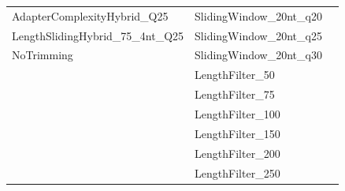 \begin{table}[ht]
{\begin{tabular}{|l|l|l|}
AdapterComplexityHybrid\_Q25               & SlidingWindow\_20nt\_q20                &                                      \\
LengthSlidingHybrid\_75\_4nt\_Q25           & SlidingWindow\_20nt\_q25                &                                      \\
NoTrimming                                  & SlidingWindow\_20nt\_q30                &                                      \\
                                            & LengthFilter\_50                        &                                      \\
                                            & LengthFilter\_75                        &                                      \\
                                            & LengthFilter\_100                       &                                      \\
                                            & LengthFilter\_150                       &                                      \\
                                            & LengthFilter\_200                       &                                      \\
                                            & LengthFilter\_250                       &                                      \\ \hline
\end{tabular}%
}
\end{table}









